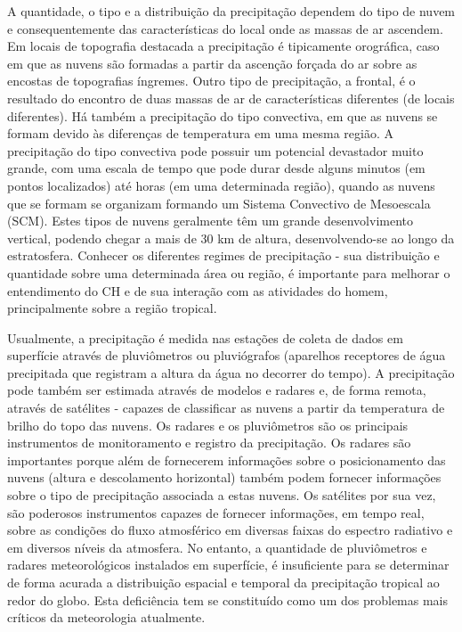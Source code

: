 A quantidade, o tipo e a distribuição da precipitação dependem do tipo de nuvem e consequentemente das características do local onde as massas de ar ascendem. Em locais de topografia destacada a precipitação é tipicamente orográfica, caso em que as nuvens são formadas a partir da ascenção forçada do ar sobre as encostas de topografias íngremes. Outro tipo de precipitação, a frontal, é o resultado do encontro de duas massas de ar de características diferentes (de locais diferentes). Há também a precipitação do tipo convectiva, em que as nuvens se formam devido às diferenças de temperatura em uma mesma região. A precipitação do tipo convectiva pode possuir um potencial devastador muito grande, com uma escala de tempo que pode durar desde alguns minutos (em pontos localizados) até horas (em uma determinada região), quando as nuvens que se formam se organizam formando um Sistema Convectivo de Mesoescala (SCM). Estes tipos de nuvens geralmente têm um grande desenvolvimento vertical, podendo chegar a mais de 30 km de altura, desenvolvendo-se ao longo da estratosfera.  Conhecer os diferentes regimes de precipitação - sua distribuição e quantidade sobre uma determinada área ou região, é importante para melhorar o entendimento do CH e de sua interação com as atividades do homem, principalmente sobre a região tropical.

Usualmente, a precipitação é medida nas estações de coleta de dados em superfície através de pluviômetros ou pluviógrafos (aparelhos receptores de água precipitada que registram a altura da água no decorrer do tempo). A precipitação pode também ser estimada através de modelos e radares e, de forma remota, através de satélites - capazes de classificar as nuvens a partir da temperatura de brilho do topo das nuvens. Os radares e os pluviômetros são os principais instrumentos de monitoramento e registro da precipitação. Os radares são importantes porque além de fornecerem informações sobre o posicionamento das nuvens (altura e descolamento horizontal) também podem fornecer informações sobre o tipo de precipitação associada a estas nuvens. Os satélites por sua vez, são poderosos instrumentos capazes de fornecer informações, em tempo real, sobre as condições do fluxo atmosférico em diversas faixas do espectro radiativo e em diversos níveis da atmosfera. No entanto, a quantidade de pluviômetros e radares meteorológicos instalados em superfície, é insuficiente para se determinar de forma acurada a distribuição espacial e temporal da precipitação tropical ao redor do globo. Esta deficiência tem se constituído como um dos problemas mais críticos da meteorologia atualmente.

